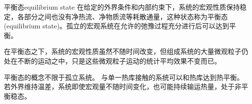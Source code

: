 \begin{definition}
	{平衡态}{equilibrium state}
	在给定的外界条件和内部约束下，系统的宏观性质保持稳定，各部分之间也没有净热流、净物质流等耗散通量，这种状态称为平衡态(equilibrium state)。孤立的宏观系统在允许的弛豫过程充分进行后可以达到平衡。
\end{definition}


\begin{remark}
	在平衡态之下，系统的宏观性质虽然不随时间改变，但组成系统的大量微观粒子仍处在不断的运动之中，只是这些微观粒子运动的统计平均效果不变而已。
\end{remark}

\begin{remark}
	平衡态的概念不限于孤立系统。
	与单一热库接触的系统可以和热库达到热平衡。若外界维持温差，系统即使宏观量不随时间变化，也可能持续输运热量，处于非平衡稳态。
\end{remark}



